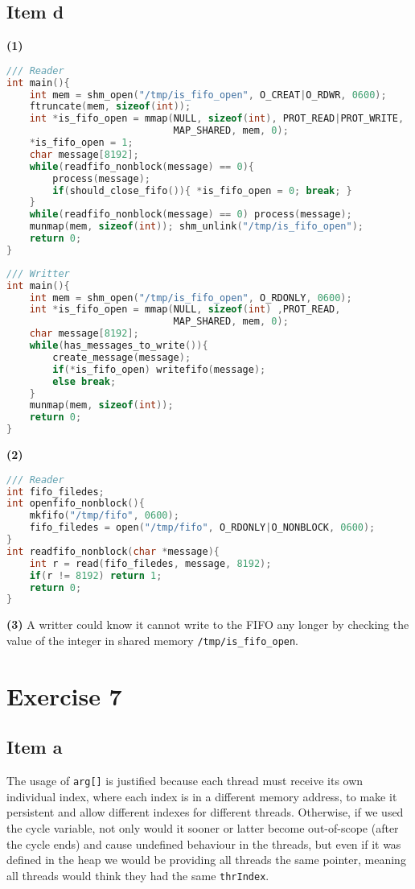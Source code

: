 {\subsection{Item d}
\textbf{(1)}
\begin{lstlisting}[language=C]
/// Reader
int main(){
    int mem = shm_open("/tmp/is_fifo_open", O_CREAT|O_RDWR, 0600);
    ftruncate(mem, sizeof(int));
    int *is_fifo_open = mmap(NULL, sizeof(int), PROT_READ|PROT_WRITE,
                             MAP_SHARED, mem, 0);
    *is_fifo_open = 1;
    char message[8192];
    while(readfifo_nonblock(message) == 0){
        process(message);
        if(should_close_fifo()){ *is_fifo_open = 0; break; }
    }
    while(readfifo_nonblock(message) == 0) process(message);
    munmap(mem, sizeof(int)); shm_unlink("/tmp/is_fifo_open");
    return 0;
}
\end{lstlisting}
\begin{lstlisting}[language=C]
/// Writter
int main(){
    int mem = shm_open("/tmp/is_fifo_open", O_RDONLY, 0600);
    int *is_fifo_open = mmap(NULL, sizeof(int) ,PROT_READ,
                             MAP_SHARED, mem, 0);
    char message[8192];
    while(has_messages_to_write()){
        create_message(message);
        if(*is_fifo_open) writefifo(message);
        else break;
    }
    munmap(mem, sizeof(int));
    return 0;
}
\end{lstlisting}

\textbf{(2)}
\begin{lstlisting}[language=C]
/// Reader
int fifo_filedes;
int openfifo_nonblock(){
    mkfifo("/tmp/fifo", 0600);
    fifo_filedes = open("/tmp/fifo", O_RDONLY|O_NONBLOCK, 0600);
}
int readfifo_nonblock(char *message){
    int r = read(fifo_filedes, message, 8192);
    if(r != 8192) return 1;
    return 0;
}
\end{lstlisting}
\textbf{(3)}
A writter could know it cannot write to the FIFO any longer by checking the value of the integer in shared memory \texttt{/tmp/is\_fifo\_open}.

\section{Exercise 7}
\subsection{Item a}
The usage of \texttt{arg[]} is justified because each thread must receive its own individual index, where each index is in a different memory address, to make it persistent and allow different indexes for different threads. Otherwise, if we used the cycle variable, not only would it sooner or latter become out-of-scope (after the cycle ends) and cause undefined behaviour in the threads, but even if it was defined in the heap we would be providing all threads the same pointer, meaning all threads would think they had the same \texttt{thrIndex}.

}
